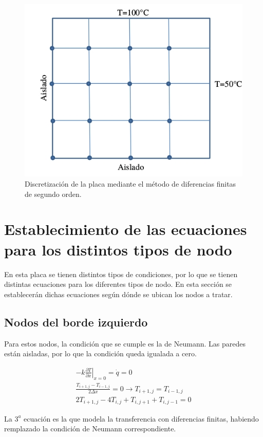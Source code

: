 \documentclass[12pt, notitlepage]{article}
\begin{document}
\begin{figure}[H]
\centering
\includegraphics[scale=0.6]{Esquema.jpg}
\caption{Discretización de la placa mediante el método de diferencias finitas de segundo orden.}
\end{figure}

\section{Establecimiento de las ecuaciones para los distintos tipos de nodo}
En esta placa se tienen distintos tipos de condiciones, por lo que se tienen distintas ecuaciones para los diferentes tipos de nodo. En esta sección se establecerán dichas ecuaciones según dónde se ubican los nodos a tratar.

\subsection{Nodos del borde izquierdo}
Para estos nodos, la condición que se cumple es la de Neumann. Las paredes están aisladas, por lo que la condición queda igualada a cero.

\begin{gather*}
-k\left.\frac{\partial T}{\partial x}\right|_{x = 0} = \dot{q} = 0 \\
\frac{T_{i+1,j} - T_{i-1,j}}{2\Delta x} = 0 \rightarrow T_{i+1,j} = T_{i-1,j}\\
2T_{i+1,j} - 4T_{i,j} + T_{i,j+1} + T_{i,j-1} = 0
\end{gather*}

La $3^a$ ecuación es la que modela la transferencia con diferencias finitas, habiendo remplazado la condición de Neumann correspondiente.
\end{document}
